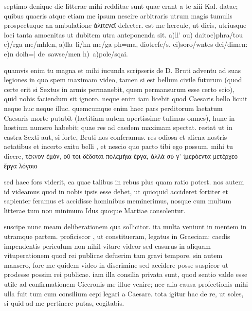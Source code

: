 


 septimo denique die litterae mihi redditae sunt quae erant a te xiii Kal. datae; quibus quaeris atque etiam me ipsum nescire arbitraris utrum magis tumulis prospectuque an ambulatione ἁλιτενεῖ delecter. est me hercule, ut dicis, utriusque loci tanta amoenitas ut dubitem utra anteponenda sit. a)ll' ou) daito\s e)phra/tou e)/rga me/mhlen, a)lla\ li/hn me/ga ph=ma, diotrefe/s, ei)soro/wntes dei/dimen: e)n doih=| de\ sawse/men h)\ a)pole/sqai.

 quamvis enim tu magna et mihi iucunda scripseris de D. Bruti adventu ad suas legiones in quo spem maximam video, tamen si est bellum civile futurum (quod certe erit si Sextus in armis permanebit, quem permansurum esse certo scio), quid nobis faciendum sit ignoro. neque enim iam licebit quod Caesaris bello licuit neque huc neque illuc. quemcumque enim haec pars perditorum laetatum Caesaris morte putabit (laetitiam autem apertissime tulimus omnes), hunc in hostium numero habebit; quae res ad caedem maximam spectat. restat ut in castra Sexti aut, si forte, Bruti nos conferamus. res odiosa et aliena nostris aetatibus et incerto exitu belli , et nescio quo pacto tibi ego possum, mihi tu dicere, τέκνον ἐμόν, οὔ τοι δέδοται πολεμήια ἔργα, ἀλλὰ σύ γ' ἱμερόεντα μετέρχεο ἔργα λόγοιο

 sed haec fors viderit, ea quae talibus in rebus plus quam ratio potest. nos autem id videamus quod in nobis ipsis esse debet, ut quicquid accideret fortiter et sapienter feramus et accidisse hominibus meminerimus, nosque cum multum litterae tum non minimum Idus quoque Martiae consolentur.

 suscipe nunc meam deliberationem qua sollicitor. ita multa veniunt in mentem in utramque partem. proficiscor , ut constitueram, legatus in Graeciam: caedis impendentis periculum non nihil vitare videor sed casurus in aliquam vituperationem quod rei publicae defuerim tam gravi tempore. sin autem mansero, fore me quidem video in discrimine sed accidere posse suspicor ut prodesse possim rei publicae. iam illa consilia privata sunt, quod sentio valde esse utile ad confirmationem Ciceronis me illuc venire; nec alia causa profectionis mihi ulla fuit tum cum consilium cepi legari a Caesare. tota igitur hac de re, ut soles, si quid ad me pertinere putas, cogitabis.

